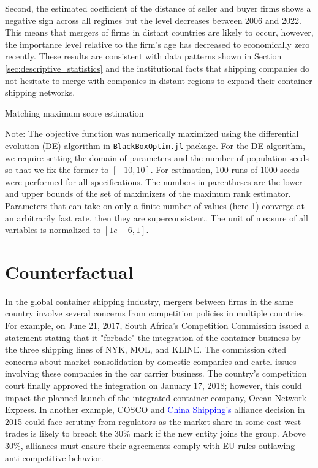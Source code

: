 \documentclass[10pt]{article}
\begin{document}
Second, the estimated coefficient of the distance of seller and buyer firms shows a negative sign across all regimes but the level decreases between 2006 and 2022. 
This means that mergers of firms in distant countries are likely to occur, however, the importance level relative to the firm's age has decreased to economically zero recently.
These results are consistent with data patterns shown in Section \ref{sec:descriptive_statistics} and the institutional facts that shipping companies do not hesitate to merge with companies in distant regions to expand their container shipping networks.

\begin{table}[!htbp]
  \begin{center}
      \caption{Matching maximum score estimation}
      \label{tb:maximum_score_estimate} 
      
  \end{center}\footnotesize
  Note: The objective function was numerically maximized using the differential evolution (DE) algorithm in \texttt{BlackBoxOptim.jl} package. For the DE algorithm, we require setting the domain of parameters and the number of population seeds so that we fix the former to $[-10, 10]$. For estimation, 100 runs of 1000 seeds were performed for all specifications. The numbers in parentheses are the lower and upper bounds of the set of maximizers of the maximum rank estimator. Parameters that can take on only a finite number of values (here 1) converge at an arbitrarily fast rate, then they are superconsistent. The unit of measure of all variables is normalized to $[1e-6,1]$. 
\end{table} 

\section{Counterfactual}\label{sec:counterfactuals}

In the global container shipping industry, mergers between firms in the same country involve several concerns from competition policies in multiple countries.
For example, on June 21, 2017, South Africa's Competition Commission issued a statement stating that it "forbade" the integration of the container business by the three shipping lines of NYK, MOL, and KLINE. 
The commission cited concerns about market consolidation by domestic companies and cartel issues involving these companies in the car carrier business.
The country's competition court finally approved the integration on January 17, 2018; however, this could impact the planned launch of the integrated container company, Ocean Network Express. 
In another example, COSCO and \textcolor{blue}{China Shipping's} alliance decision in 2015 could face scrutiny from regulators as the market share in some east-west trades is likely to breach the 30\% mark if the new entity joins the group. Above 30\%, alliances must ensure their agreements comply with EU rules outlawing anti-competitive behavior.
\end{document}
